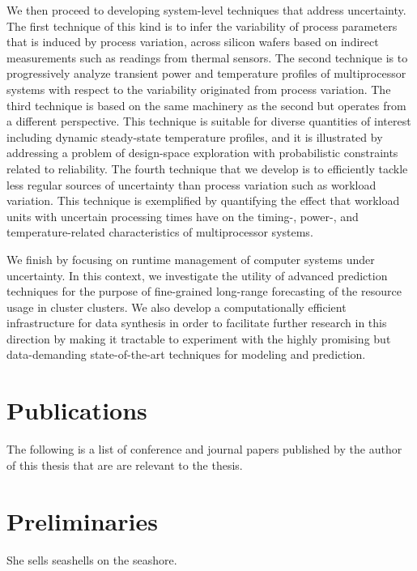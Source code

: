 We then proceed to developing system-level techniques that address uncertainty.
The first technique of this kind is to infer the variability of process
parameters that is induced by process variation, across silicon wafers based on
indirect measurements such as readings from thermal sensors. The second
technique is to progressively analyze transient power and temperature profiles
of multiprocessor systems with respect to the variability originated from
process variation. The third technique is based on the same machinery as the
second but operates from a different perspective. This technique is suitable for
diverse quantities of interest including dynamic steady-state temperature
profiles, and it is illustrated by addressing a problem of design-space
exploration with probabilistic constraints related to reliability. The fourth
technique that we develop is to efficiently tackle less regular sources of
uncertainty than process variation such as workload variation. This technique is
exemplified by quantifying the effect that workload units with uncertain
processing times have on the timing-, power-, and temperature-related
characteristics of multiprocessor systems.

We finish by focusing on runtime management of computer systems under
uncertainty. In this context, we investigate the utility of advanced prediction
techniques for the purpose of fine-grained long-range forecasting of the
resource usage in cluster clusters. We also develop a computationally efficient
infrastructure for data synthesis in order to facilitate further research in
this direction by making it tractable to experiment with the highly promising
but data-demanding state-of-the-art techniques for modeling and prediction.

\section{Publications}

The following is a list of conference and journal papers published by the author
of this thesis that are are relevant to the thesis.

\printbibliography[heading=none,keyword=own]

\section{Preliminaries}

She sells seashells on the seashore.
